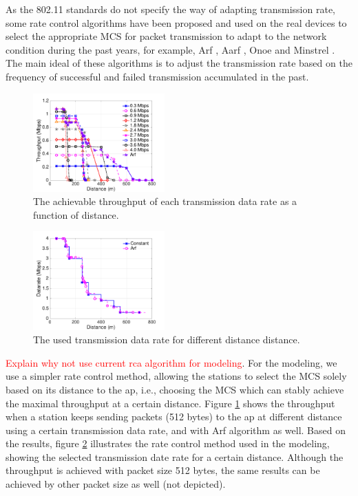 As the 802.11 standards do not specify the way of adapting transmission rate, some rate control algorithms have been proposed and used on the real devices to select the appropriate MCS for packet transmission to adapt to the network condition during the past years, for example, Arf \cite{arf1997},  Aarf \cite{aarf2004}, Onoe \cite{Onoe} and Minstrel \cite{minstrel}. The main ideal of these algorithms is to adjust the transmission rate based on the frequency of successful and failed transmission accumulated in the past. 


\begin{figure}[t]
  \centering
   \includegraphics[width=0.45\textwidth]{figures/distance-throughput-512bytes}  \caption{The achievable throughput of each transmission data rate as a function of distance. \label{fig:dist-throughput}}
\end{figure}

\begin{figure}[t]
  \centering
   \includegraphics[width=0.45\textwidth]{figures/distance-datarate-512bytes}  \caption{The used transmission data rate for different distance distance. \label{fig:dist-datarate}}
\end{figure}

\textcolor{red}{Explain why not use current rca algorithm for modeling}. For the modeling, we use a simpler rate control method, allowing the stations to select the MCS solely based on its distance to the \gls{ap}, i.e., choosing the MCS which can stably achieve the maximal throughput at a certain distance. Figure \ref{fig:dist-throughput} shows the throughput when a station keeps sending packets (512 bytes) to the \gls{ap} at different distance using a certain transmission data rate, and with Arf algorithm as well. Based on the results, figure \ref{fig:dist-datarate} illustrates the rate control method used in the modeling, showing the selected transmission date rate for a certain distance.
Although the throughput is achieved with packet size 512 bytes, the same results can be achieved by other packet size as well (not depicted).


